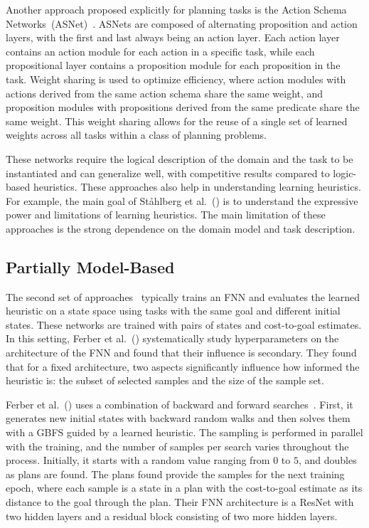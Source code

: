 Another approach proposed explicitly for planning tasks is the Action Schema Networks~(ASNet)~\cite{Toyer.etal/2018}. ASNets are composed of alternating proposition and action layers, with the first and last always being an action layer. Each action layer contains an action module for each action in a specific task, while each propositional layer contains a proposition module for each proposition in the task. Weight sharing is used to optimize efficiency, where action modules with actions derived from the same action schema share the same weight, and proposition modules with propositions derived from the same predicate share the same weight. This weight sharing allows for the reuse of a single set of learned weights across all tasks within a class of planning problems.

These networks require the logical description of the domain and the task to be instantiated and can generalize well, with competitive results compared to logic-based heuristics. These approaches also help in understanding learning heuristics. For example, the main goal of St\aa hlberg et al.~(\citeyear{Stahlberg.etal/2022}) is to understand the expressive power and limitations of learning heuristics. The main limitation of these approaches is the strong dependence on the domain model and task description.

\subsection{Partially Model-Based}

The second set of approaches~\cite{Ferber.etal/2020a, Yu.etal/2020, Ferber.etal/2022, OToole/2022} typically trains an FNN and evaluates the learned heuristic on a state space using tasks with the same goal and different initial states. These networks are trained with pairs of states and cost-to-goal estimates. In this setting, Ferber et al.~(\citeyear{Ferber.etal/2020a}) systematically study hyperparameters on the architecture of the FNN and found that their influence is secondary. They found that for a fixed architecture, two aspects significantly influence how informed the heuristic is: the subset of selected samples and the size of the sample set. 

Ferber et al.~(\citeyear{Ferber.etal/2022}) uses a combination of backward and forward searches~\cite{Arfaee.etal/2011}. First, it generates new initial states with backward random walks and then solves them with a GBFS guided by a learned heuristic. The sampling is performed in parallel with the training, and the number of samples per search varies throughout the process. Initially, it starts with a random value ranging from $0$ to $5$, and doubles as plans are found. The plans found provide the samples for the next training epoch, where each sample is a state in a plan with the cost-to-goal estimate as its distance to the goal through the plan. Their FNN architecture is a ResNet with two hidden layers and a residual block consisting of two more hidden layers.

